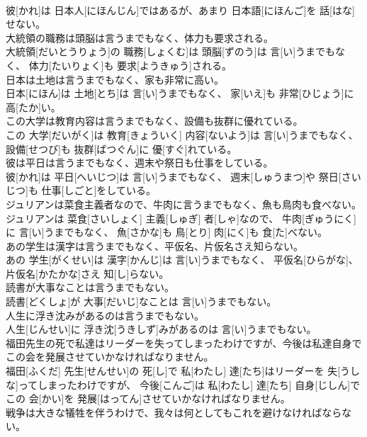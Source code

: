 \documentclass[8pt]{extreport}
\begin{document}
\begin{CJK}{UTF8}{min}
\\	彼[かれ]は 日本人[にほんじん]ではあるが、あまり 日本語[にほんご]を 話[はな]せない。
\\	大統領の職務は頭脳は言うまでもなく、体力も要求される。	
\\	大統領[だいとうりょう]の 職務[しょくむ]は 頭脳[ずのう]は 言[い]うまでもなく、 体力[たいりょく]も 要求[ようきゅう]される。
\\	日本は土地は言うまでもなく、家も非常に高い。	
\\	日本[にほん]は 土地[とち]は 言[い]うまでもなく、 家[いえ]も 非常[ひじょう]に 高[たか]い。
\\	この大学は教育内容は言うまでもなく、設備も抜群に優れている。	
\\	この 大学[だいがく]は 教育[きょういく] 内容[ないよう]は 言[い]うまでもなく、 設備[せつび]も 抜群[ばつぐん]に 優[すぐ]れている。
\\	彼は平日は言うまでもなく、週末や祭日も仕事をしている。	
\\	彼[かれ]は 平日[へいじつ]は 言[い]うまでもなく、 週末[しゅうまつ]や 祭日[さいじつ]も 仕事[しごと]をしている。
\\	ジュリアンは菜食主義者なので、牛肉に言うまでもなく、魚も鳥肉も食べない。	
\\	ジュリアンは 菜食[さいしょく] 主義[しゅぎ] 者[しゃ]なので、 牛肉[ぎゅうにく]に 言[い]うまでもなく、 魚[さかな]も 鳥[とり] 肉[にく]も 食[た]べない。
\\	あの学生は漢字は言うまでもなく、平仮名、片仮名さえ知らない。	
\\	あの 学生[がくせい]は 漢字[かんじ]は 言[い]うまでもなく、 平仮名[ひらがな]、 片仮名[かたかな]さえ 知[し]らない。
\\	読書が大事なことは言うまでもない。	
\\	読書[どくしょ]が 大事[だいじ]なことは 言[い]うまでもない。
\\	人生に浮き沈みがあるのは言うまでもない。	
\\	人生[じんせい]に 浮き沈[うきしず]みがあるのは 言[い]うまでもない。
\\	福田先生の死で私達はリーダーを失ってしまったわけですが、今後は私達自身でこの会を発展させていかなければなりません。	
\\	福田[ふくだ] 先生[せんせい]の 死[し]で 私[わたし] 達[たち]はリーダーを 失[うしな]ってしまったわけですが、 今後[こんご]は 私[わたし] 達[たち] 自身[じしん]でこの 会[かい]を 発展[はってん]させていかなければなりません。
\\	戦争は大きな犠牲を伴うわけで、我々は何としてもこれを避けなければならない。	

\end{CJK}
\end{document}

